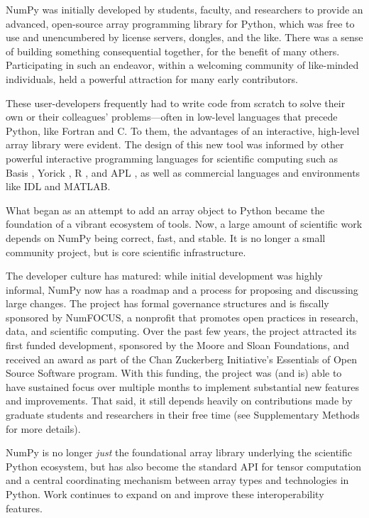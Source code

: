 \documentclass[twocolumn]{article}
\begin{document}
NumPy was initially developed by students, faculty, and researchers to
provide an advanced, open-source array programming library for Python,
which was free to use and unencumbered by license servers, dongles, and the like.
There was a sense of building something consequential together,
for the benefit of many others.  Participating in
such an endeavor, within a welcoming community of like-minded
individuals, held a powerful attraction for many early contributors.

These user-developers frequently had to write code from scratch to solve
their own or their colleagues' problems---often in low-level languages
that precede Python, like Fortran \cite{dongarra2008netlib} and C.
To them, the advantages of an interactive, high-level array library
were evident. The design of this new tool was informed by other
powerful interactive programming languages for scientific computing
such as Basis \cite{dubois1989basis}, Yorick \cite{munro1995using}, R \cite{ihaka1996r},
and APL \cite{iverson1962programming},
as well as commercial languages and environments like IDL and {MATLAB}.

What began as an attempt to add an array object to Python became the
foundation of a vibrant ecosystem of tools.  Now, a large amount of
scientific work depends on NumPy being correct, fast, and stable.  It
is no longer a small community project, but is core scientific
infrastructure.

The developer culture has matured: while initial development was
highly informal, NumPy now has a roadmap and a process for proposing
and discussing large changes.  The project has formal governance
structures and is fiscally sponsored by NumFOCUS, a nonprofit that
promotes open practices in research, data, and scientific computing.
Over the past few years, the project attracted its first funded
development, sponsored by the Moore and Sloan Foundations, and
received an award as part of the Chan Zuckerberg Initiative's
Essentials of Open Source Software program.  With this funding, the
project was (and is) able to have sustained focus over multiple months
to implement substantial new features and improvements.  That said, it
still depends heavily on contributions made by graduate students and
researchers in their free time (see Supplementary Methods for more details).

NumPy is no longer \emph{just} the foundational array library underlying
the scientific Python ecosystem, but has also become the standard API
for tensor computation and a central coordinating mechanism between
array types and technologies in Python. Work continues to expand on and
improve these interoperability features.
\end{document}
